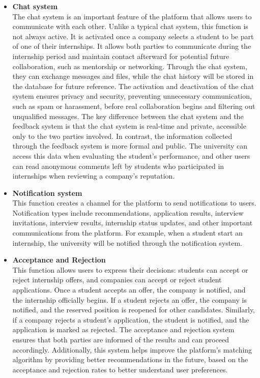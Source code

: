 \begin{itemize}[label={ }]
    \item \textcolor{bluepoli}{\textbf{Chat system}}
    \\The chat system is an important feature of the platform that allows users to communicate with each other. Unlike a typical chat system, this function
    is not always active. It is activated once a company selects a student to be part of one of their internships. 
    It allows both parties to communicate during the internship period and maintain contact afterward for potential future collaboration, such as mentorship 
    or networking. Through the chat system, they can exchange messages and files, while the chat history will be stored in the database for future reference.
    The activation and deactivation of the chat system ensures privacy and security, preventing unnecessary communication, such as spam or harassment, 
    before real collaboration begins and filtering out unqualified messages.
    The key difference between the chat system and the feedback system is that the chat system is real-time and private, accessible only to the two parties 
    involved. In contrast, the information collected through the feedback system is more formal and public. The university can access this data when evaluating
    the student's performance, and other users can read anonymous comments left by students who participated in internships when reviewing a company's reputation.

    \item \textcolor{bluepoli}{\textbf{Notification system}}
    \\This function creates a channel for the platform to send notifications to users. Notification types include recommendations, application results,
    interview invitations, interview results, internship status updates, and other important communications from the platform. For example, when a student
    start an internship, the university will be notified through the notification system.

    \item \textcolor{bluepoli}{\textbf{Acceptance and Rejection}}
    \\This function allows users to express their decisions: students can accept or reject internship offers, and companies can accept or reject student applications.
    Once a student accepts an offer, the company is notified, and the internship officially begins. If a student rejects an offer, the company is notified, and the 
    reserved position is reopened for other candidates. Similarly, if a company rejects a student’s application, the student is notified, and the application is 
    marked as rejected.
    The acceptance and rejection system ensures that both parties are informed of the results and can proceed accordingly. Additionally, this system helps 
    improve the platform's matching algorithm by providing better recommendations in the future, based on the acceptance and rejection rates to better understand 
    user preferences.
\end{itemize}

